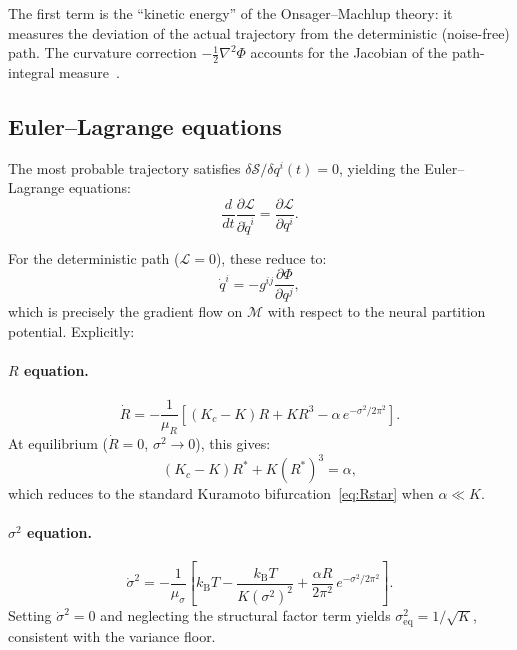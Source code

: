 \documentclass[twocolumn,aps,prl,superscriptaddress,floatfix]{revtex4-2}
\newcommand{\Lag}{\mathcal{L}}
\newcommand{\Action}{\mathcal{S}}
\newcommand{\Pot}{\Phi}
\newcommand{\kB}{k_{\mathrm{B}}}
\newcommand{\Kc}{K_c}
\begin{document}
The first term is the ``kinetic energy'' of the Onsager--Machlup theory: it measures the deviation of the actual trajectory from the deterministic (noise-free) path.
The curvature correction $-\frac{1}{2}\nabla^2\Pot$ accounts for the Jacobian of the path-integral measure~\cite{graham1977}.

\subsection{Euler--Lagrange equations}

The most probable trajectory satisfies $\delta\Action/\delta q^i(t) = 0$, yielding the Euler--Lagrange equations:
\begin{equation}
\frac{d}{dt}\frac{\partial\Lag}{\partial\dot{q}^i} = \frac{\partial\Lag}{\partial q^i}.
\label{eq:EL}
\end{equation}

For the deterministic path ($\Lag = 0$), these reduce to:
\begin{equation}
\dot{q}^i = -g^{ij}\frac{\partial\Pot}{\partial q^j},
\label{eq:gradient_flow}
\end{equation}
which is precisely the gradient flow on $\mathcal{M}$ with respect to the neural partition potential.
Explicitly:

\paragraph{$R$ equation.}
\begin{equation}
\dot{R} = -\frac{1}{\mu_R}\left[(\Kc - K)R + K R^3 - \alpha\,e^{-\sigma^2/2\pi^2}\right].
\label{eq:Rdot}
\end{equation}
At equilibrium ($\dot{R} = 0$, $\sigma^2 \to 0$), this gives:
\begin{equation}
(\Kc - K)R^* + K(R^*)^3 = \alpha,
\end{equation}
which reduces to the standard Kuramoto bifurcation~\eqref{eq:Rstar} when $\alpha \ll K$.

\paragraph{$\sigma^2$ equation.}
\begin{equation}
\dot{\sigma}^2 = -\frac{1}{\mu_\sigma}\left[\kB T - \frac{\kB T}{K(\sigma^2)^2} + \frac{\alpha R}{2\pi^2}\,e^{-\sigma^2/2\pi^2}\right].
\label{eq:sigmadot}
\end{equation}
Setting $\dot{\sigma}^2 = 0$ and neglecting the structural factor term yields $\sigma^2_{\mathrm{eq}} = 1/\sqrt{K}$, consistent with the variance floor.
\end{document}
